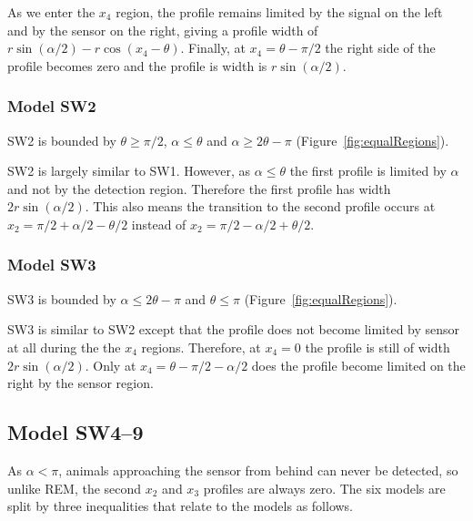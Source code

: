 As we enter the $x_4$ region, the profile remains limited by the signal on the left and by the sensor on the right, giving a profile width of  $r\sin (\alpha /2) -r\cos(x_4-\theta) $.
Finally, at $x_4 = \theta - \pi/2$ the right side of the profile becomes zero and the profile is width is $r\sin(\alpha /2)$.



\subsubsection{Model SW2} \label{SW2}

SW2 is bounded by $\theta \ge \pi/2$, $\alpha \le \theta$ and $\alpha \ge 2\theta -\pi$ (Figure~\ref{fig:equalRegions}).

SW2 is largely similar to SW1.
However, as $\alpha \le \theta$ the first profile is limited by $\alpha$ and not by the detection region.
Therefore the first profile has width $2r\sin(\alpha /2)$.
This also means the transition to the second profile occurs at  $x_2 = \pi/2 + \alpha/2 - \theta/2$ instead of  $x_2 = \pi/2 - \alpha/2 + \theta/2$.





\subsubsection{Model SW3} \label{SW3}

SW3 is bounded by $\alpha \le 2\theta -\pi$ and $\theta \le \pi$ (Figure~\ref{fig:equalRegions}).

SW3 is similar to SW2 except that the profile does not become limited by sensor at all during the the $x_4$ regions.
Therefore, at $x_4 = 0 $ the profile is still of width $2r\sin(\alpha /2)$.
Only at $x_4 = \theta - \pi/2 - \alpha/2$ does the profile become limited on the right by the sensor region.




\subsection{Model SW4--9} \label{SW4--9}

As $\alpha < \pi$, animals approaching the sensor from behind can never be detected, so unlike REM, the second $x_2$ and $x_3$ profiles are always zero.
The six models are split by three inequalities that relate to the models as follows.

